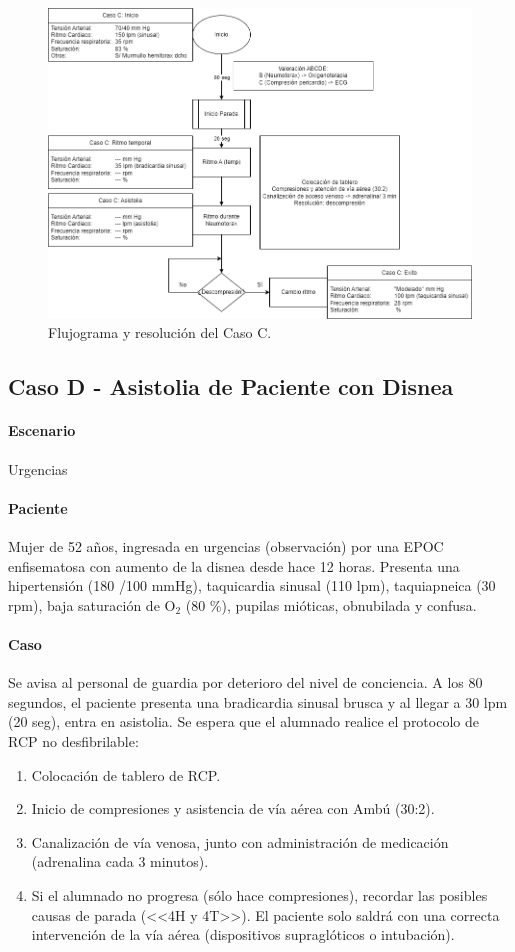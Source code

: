 \begin{figure}[hptb]
    \centering
	\includegraphics[width=0.8\linewidth]{./imagenes/ACV-AdSC-CasosUCI_CasoC.png}
	\caption{\label{fig:Brusilov:SVI:CasoC}Flujograma y resolución del Caso C.}
\end{figure}
\clearpage

\subsection{Caso D - Asistolia de Paciente con Disnea}
\paragraph{Escenario} Urgencias
\vspace{-12.5pt}
\paragraph{Paciente} Mujer de 52 años, ingresada en urgencias (observación) por una EPOC enfisematosa con aumento de la disnea desde hace 12 horas. Presenta una hipertensión (180 /100 mmHg), taquicardia sinusal (110 lpm), taquiapneica (30 rpm), baja saturación de O$_2$ (80 \%), pupilas mióticas, obnubilada y confusa.
\vspace{-12.5pt}
\paragraph{Caso} Se avisa al personal de guardia por deterioro del nivel de conciencia. A los 80 segundos, el paciente presenta una bradicardia sinusal brusca y al llegar a 30 lpm (20 seg), entra en asistolia. Se espera que el alumnado realice el protocolo de RCP no desfibrilable:
\begin{enumerate}[topsep=0pt, partopsep=0pt,itemsep=0pt,parsep=0pt]
    \item Colocación de tablero de RCP.
    \item Inicio de compresiones y asistencia de vía aérea con Ambú (30:2).
    \item Canalización de vía venosa, junto con administración de medicación (adrenalina cada 3 minutos).
    \item Si el alumnado no progresa (sólo hace compresiones), recordar las posibles causas de parada (<<4H y 4T>>). El paciente solo saldrá con una correcta intervención de la vía aérea (dispositivos supraglóticos o intubación).
\end{enumerate}
\vspace{-12.5pt}
